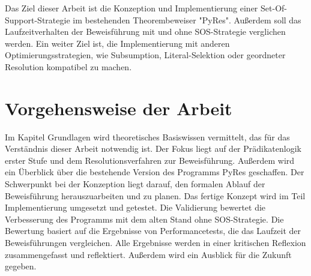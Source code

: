 Das Ziel dieser Arbeit ist die Konzeption und Implementierung einer Set-Of-Support-Strategie im bestehenden Theorembeweiser "PyRes". Außerdem soll das Laufzeitverhalten der Beweisführung mit und ohne SOS-Strategie verglichen werden. Ein weiter Ziel ist, die Implementierung mit anderen Optimierungsstrategien, wie Subsumption, Literal-Selektion oder geordneter Resolution kompatibel zu machen.

\section{Vorgehensweise der Arbeit}

Im Kapitel Grundlagen wird theoretisches Basiswissen vermittelt, das für das Verständnis dieser Arbeit notwendig ist. Der Fokus liegt auf der Prädikatenlogik erster Stufe und dem Resolutionsverfahren zur Beweisführung. Außerdem wird ein Überblick über die bestehende Version des Programms PyRes geschaffen.
Der Schwerpunkt bei der Konzeption liegt darauf, den formalen Ablauf der Beweisführung herauszuarbeiten und zu planen. Das fertige Konzept wird im Teil Implementierung umgesetzt und getestet.
Die Validierung bewertet die Verbesserung des Programms mit dem alten Stand ohne SOS-Strategie. Die Bewertung basiert auf die Ergebnisse von Performancetests, die das Laufzeit der Beweisführungen vergleichen.
Alle Ergebnisse werden in einer kritischen Reflexion zusammengefasst und reflektiert. Außerdem wird ein Ausblick für die Zukunft gegeben.